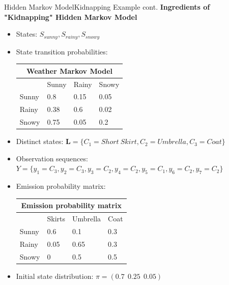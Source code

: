 \documentclass[10pt]{beamer}
\begin{document}
\begin{frame}{Hidden Markov Model}{Kidnapping Example cont.}
  \textbf{Ingredients of "Kidnapping" Hidden Markov Model}
  \fontsize{7.5}{10.5}
 {
  \begin{itemize}
     \item States: ${S_{sunny}, S_{rainy}, S_{snowy}}$
     \item State transition probabilities: 
            \begin{center}
              \begin{tabular}{ |p{2cm}|p{1.2cm}|p{1.2cm}|p{1.2cm}| }
                \hline
                 \multicolumn{4}{|c|}{Weather Markov Model} \\
                \hline
                        & Sunny & Rainy & Snowy \\
                \hline
                     Sunny & 0.8  & 0.15 & 0.05\\
                     Rainy & 0.38 & 0.6  & 0.02\\
                     Snowy & 0.75 & 0.05 & 0.2\\
                \hline
              \end{tabular}
              \end{center}
      \item Distinct states: $\textbf{L} = \{C_1 = Short\ Skirt, C_2 = Umbrella, C_3 = Coat\}$
      \item Observation sequences: $Y = \{y_1 = C_3, y_2 = C_3, y_3 = C_2, y_4 = C_2, y_5 = C_1, y_6 = C_2, y_7 = C_2\}$
      \item Emission probability matrix:
            \begin{center}
              \begin{tabular}{ |p{2cm}|p{1.2cm}|p{1.2cm}|p{1.2cm}| }
                \hline
                 \multicolumn{4}{|c|}{Emission probability matrix} \\
                \hline
                        & Skirts & Umbrella & Coat \\
                \hline
                     Sunny & 0.6  & 0.1 & 0.3\\
                     Rainy & 0.05 & 0.65  & 0.3\\
                     Snowy & 0    & 0.5 & 0.5\\
                \hline
              \end{tabular}
              \end{center}
       \item Initial state distribution: $\pi = (0.7\ \ 0.25\ \ 0.05)$ 
  \end{itemize}
 }
\end{frame}
\end{document}
